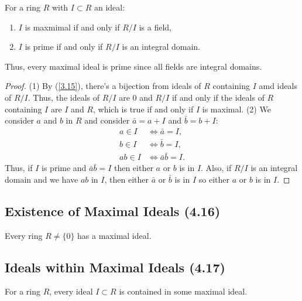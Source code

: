 For a ring $R$ with $I \subset R$ an ideal: \begin{enumerate}
    \item $I$ is maxmimal if and only if $R / I$ is a field,
    \item $I$ is prime if and only if $R / I$ is an integral domain.
\end{enumerate} Thus, every maximal ideal is prime since all
fields are integral domains.

\begin{proof}
    (1) By (\ref{3.15}), there's a bijection from ideals of $R$
    containing $I$ amd ideals of $R / I$. Thus, the ideals of $R / I$
    are $0$ and $R / I$ if and only if the ideals of $R$ containing
    $I$ are $I$ and $R$, which is true if and only if $I$ is maximal.
    \bs
    (2) We consider $a$ and $b$ in $R$ and consider $\bar{a} = a + I$
    and $\bar{b} = b + I$: \begin{align*}
        a \in I &\Longleftrightarrow \bar{a} = I, \\
        b \in I &\Longleftrightarrow \bar{b} = I, \\
        ab \in I &\Longleftrightarrow \bar{a}\bar{b} = I.
    \end{align*} Thus, if $I$ is prime and $\bar{a}\bar{b} = I$ then
    either $a$ or $b$ is in $I$. Also, if $R / I$ is an integral domain
    and we have $ab$ in $I$, then either $\bar{a}$ or $\bar{b}$ is in
    $I$ so either $a$ or $b$ is in $I$.
\end{proof}

\subsection{Existence of Maximal Ideals (4.16)} \label{4.16}

Every ring $R \neq \{0\}$ has a maximal ideal.

\subsection{Ideals within Maximal Ideals (4.17)} \label{4.17}

For a ring $R$, every ideal $I \subset R$ is contained in some
maximal ideal.
